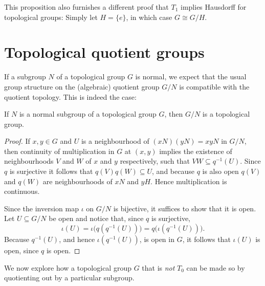 \documentclass[article, a4paper, 11pt, oneside]{memoir}
\numberwithin{equation}{chapter}
\newcommand{\preim}{^{-1}}
\begin{document}
This proposition also furnishes a different proof that $T_1$ implies Hausdorff for topological groups: Simply let $H = \{e\}$, in which case $G \cong G/H$.


\section{Topological quotient groups}

If a subgroup $N$ of a topological group $G$ is normal, we expect that the usual group structure on the (algebraic) quotient group $G/N$ is compatible with the quotient topology. This is indeed the case:

\begin{theorem}
    If $N$ is a normal subgroup of a topological group $G$, then $G/N$ is a topological group.
\end{theorem}

\begin{proof}
    If $x,y \in G$ and $U$ is a neighbourhood of $(xN)(yN) = xyN$ in $G/N$, then continuity of multiplication in $G$ at $(x,y)$ implies the existence of neighbourhoods $V$ and $W$ of $x$ and $y$ respectively, such that $VW \subseteq q\preim(U)$. Since $q$ is surjective it follows that $q(V) q(W) \subseteq U$, and because $q$ is also open $q(V)$ and $q(W)$ are neighbourhoods of $xN$ and $yH$. Hence multiplication is continuous.

    Since the inversion map $\iota$ on $G/N$ is bijective, it suffices to show that it is open. Let $U \subseteq G/N$ be open and notice that, since $q$ is surjective,
    \begin{equation*}
        \iota(U)
            = \iota \bigl( q(q\preim(U)) \bigr)
            = q \bigl( \iota(q\preim(U)) \bigr).
    \end{equation*}
    Because $q\preim(U)$, and hence $\iota(q\preim(U))$, is open in $G$, it follows that $\iota(U)$ is open, since $q$ is open.
\end{proof}

We now explore how a topological group $G$ that is \emph{not} $T_0$ can be made so by quotienting out by a particular subgroup.


\nocite{*}

\printbibliography
\end{document}

